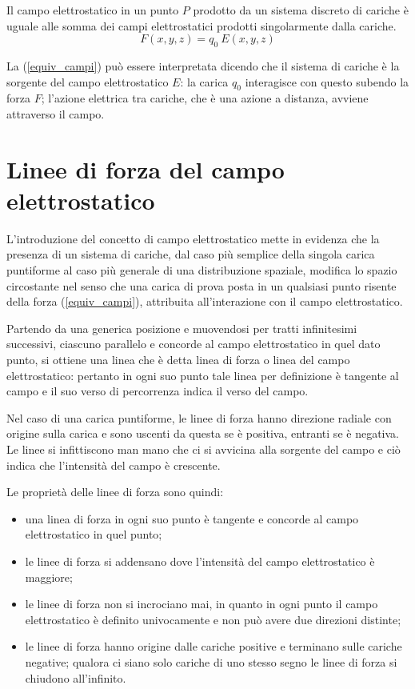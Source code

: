 \documentclass[class=book, crop=false, oneside, 12pt]{standalone}
\begin{document}
Il campo elettrostatico in un punto \(P\) prodotto da un sistema discreto di cariche è uguale alle somma dei campi elettrostatici prodotti singolarmente dalla cariche.
\begin{equation} \label{equiv_campi}
    F ( x, y, z) = q_0 \ E ( x, y, z) 
\end{equation}

La (\ref{equiv_campi}) può essere interpretata dicendo che il sistema di cariche è la sorgente del campo elettrostatico \(E\): la carica \(q_0\) interagisce con questo subendo la forza \(F\); 
l'azione elettrica tra cariche, che è una azione a distanza, avviene attraverso il campo. 

\section{Linee di forza del campo elettrostatico}
L'introduzione del concetto di campo elettrostatico mette in evidenza che la presenza di un sistema di cariche, dal caso più semplice della singola carica puntiforme al caso più generale di una distribuzione spaziale, modifica lo spazio circostante nel senso che una carica di prova posta in un qualsiasi punto risente della forza (\ref{equiv_campi}), attribuita all'interazione con il campo elettrostatico.

Partendo da una generica posizione e muovendosi per tratti infinitesimi successivi, ciascuno parallelo e concorde al campo elettrostatico in quel dato punto, si ottiene una linea che è detta linea di forza o linea del campo elettrostatico: 
pertanto in ogni suo punto tale linea per definizione è tangente al campo e il suo verso di percorrenza indica il verso del campo.

Nel caso di una carica puntiforme, le linee di forza hanno direzione radiale con origine sulla carica e sono uscenti da questa se è positiva, entranti se è negativa. 
Le linee si infittiscono man mano che ci si avvicina alla sorgente del campo e ciò indica che l'intensità del campo è crescente. 

Le proprietà delle linee di forza sono quindi:
\begin{itemize}
    \item una linea di forza in ogni suo punto è tangente e concorde al campo elettrostatico in quel punto;
    \item le linee di forza si addensano dove l'intensità del campo elettrostatico è maggiore; 
    \item le linee di forza non si incrociano mai, in quanto in ogni punto il campo elettrostatico è definito univocamente e non può avere due direzioni distinte;
    \item le linee di forza hanno origine dalle cariche positive e terminano sulle cariche negative; qualora ci siano solo cariche di uno stesso segno le linee di forza si chiudono all'infinito.
\end{itemize}
\end{document}
